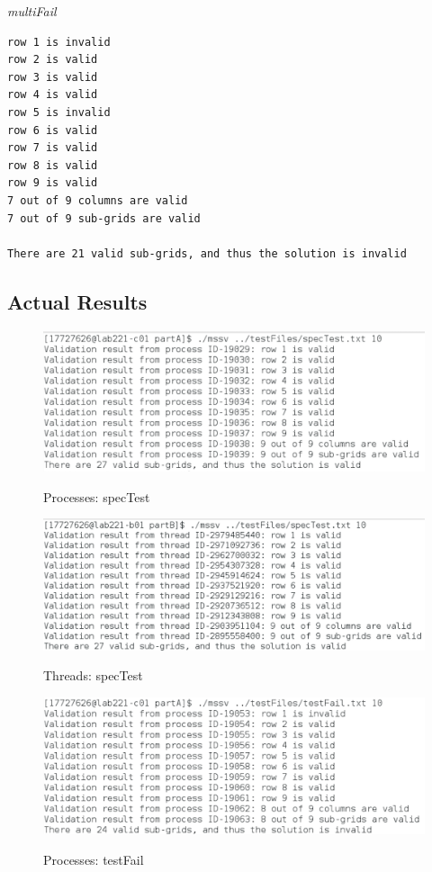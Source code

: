 \documentclass[]{article}
\begin{document}
\vspace{1cm}
\textit{multiFail}
\begin{lstlisting}
row 1 is invalid
row 2 is valid
row 3 is valid
row 4 is valid
row 5 is invalid
row 6 is valid
row 7 is valid
row 8 is valid
row 9 is valid
7 out of 9 columns are valid
7 out of 9 sub-grids are valid

There are 21 valid sub-grids, and thus the solution is invalid
\end{lstlisting}
\subsection{Actual Results}


	\begin{figure}[H]
	\caption{Processes: specTest}
	\begin{center}
		{
			\includegraphics[height=0.25\textheight,width=1.0
			\textwidth]{Pro_spec.png}}
	\end{center}
	\end{figure}
	
	
	\begin{figure}[H]
	\caption{Threads: specTest}		
		\begin{center}
			{
				\includegraphics[height=0.25\textheight,width=1.0
				\textwidth]{Thr_spec.png}}
		\end{center}
	\end{figure}

	\begin{figure}[H]
	\caption{Processes: testFail}
	\begin{center}
		{
			\includegraphics[height=0.25\textheight,width=1.0
			\textwidth]{Pro_testF.png}}
	\end{center}
	\end{figure}
\end{document}
